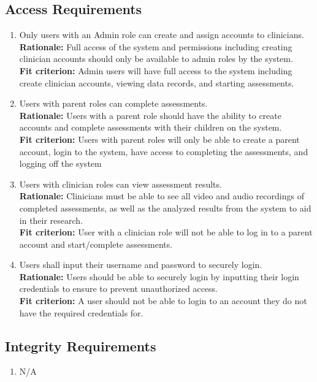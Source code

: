 \documentclass[12pt]{article}
\begin{document}
\subsection{Access Requirements}
\begin{enumerate}[{SR-AC}1. ]
  \item Only users with an Admin role can create and assign accounts to clinicians.\\
  \textbf{Rationale: }Full access of the system and permissions including creating clinician accounts should only be available to admin roles by the system. \\
  \textbf{Fit criterion: }Admin users will have full access to the system including create clinician accounts, viewing data records, and starting assessments. 
  \item Users with parent roles can complete assessments.\\
  \textbf{Rationale: }Users with a parent role should have the ability to create accounts and complete assessments with their children on the system.\\
  \textbf{Fit criterion: }Users with parent roles will only be able to create a parent account, login to the system, have access to completing the assessments, and logging off the system 
  \item Users with clinician roles can view assessment results.\\
  \textbf{Rationale: }Clinicians must be able to see all video and audio recordings of completed assessments, as well as the analyzed results from the system to aid in their research. \\
  \textbf{Fit criterion: }User with a clinician role will not be able to log in to a parent account and start/complete assessments. 
  \item Users shall input their username and password to securely login.\\
  \textbf{Rationale: }Users should be able to securely login by inputting their login credentials to ensure to prevent unauthorized access. \\
  \textbf{Fit criterion: }A user should not be able to login to an account they do not have the required credentials for.
\end{enumerate}
\subsection{Integrity Requirements}
\begin{enumerate}[{SR-INT}1. ]
  \item N/A
\end{enumerate}
\end{document}
